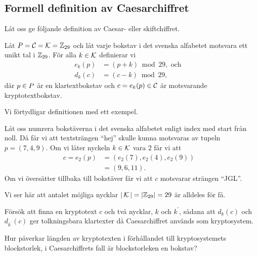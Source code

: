 \subsection{Formell definition av Caesarchiffret}
Låt oss ge följande definition av Caesar- eller skiftchiffret.
\begin{definition}[Skiftchiffer]\label{def:shiftCipher}
  Låt \(\P = \C = \K = \Z_{29}\) och låt varje bokstav i det svenska alfabetet 
  motsvara ett unikt tal i \(\mathbb{Z}_{29}\).
  För alla \(k\in \operatorname{\mathcal{K}}\) definierar vi
  \begin{align}
    \nonumber
    e_k(p) &= (p + k) \bmod 29, \text{\ och\ } \\
    \nonumber
    d_k(c) &= (c - k) \bmod 29,
  \end{align}
  där \(p\in \P\) är en klartextbokstav och \(c = e_k(p)\in \operatorname{\mathcal{C}}\) är motsvarande 
  kryptotextbokstav.
\end{definition}

Vi förtydligar definitionen med ett exempel.
\begin{example}\label{ex:shiftdef}
  Låt oss numrera bokstäverna i det svenska alfabetet enligt index med start 
  från noll.
  Då får vi att textsträngen \enquote{hej} skulle kunna motsvaras av tupeln \(p 
    = (7, 4, 9)\).
  Om vi låter nyckeln \(k\in \operatorname{\mathcal{K}}\) vara \(2\) får vi att
  \begin{align}
    \nonumber
    c = e_2(p) &= (e_2(7), e_2(4), e_2(9)) \\
    \nonumber
      &= (9, 6, 11).
  \end{align}
  Om vi översätter tillbaka till bokstäver får vi att \(c\) motsvarar strängen 
  \enquote{JGL}.
\end{example}

Vi ser här att antalet möjliga nycklar \(|\operatorname{\mathcal{K}}| = |\mathbb{Z}_{29}| = 29\) är alldeles 
för få.

\begin{exercise}
  Försök att finna en kryptotext \(c\) och två nycklar, \(k\) och \(k^\prime\), 
  sådana att \(d_k(c)\) och \(d_{k^\prime}(c)\) ger tolkningsbara klartexter då 
  Caesarchiffret används som kryptosystem.
\end{exercise}
\begin{exercise}
  Hur påverkar längden av kryptotexten i förhållandet till kryptosystemets 
  blockstorlek, i Caesarchiffrets fall är blockstorleken en bokstav?
\end{exercise}

